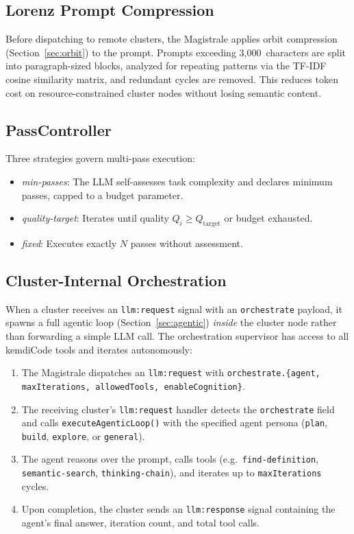 \documentclass[journal,10pt]{IEEEtran}
\newcommand{\code}[1]{\texttt{#1}}
\begin{document}
\subsection{Lorenz Prompt Compression}

Before dispatching to remote clusters, the Magistrale applies orbit compression (Section~\ref{sec:orbit}) to the prompt. Prompts exceeding 3{,}000~characters are split into paragraph-sized blocks, analyzed for repeating patterns via the TF-IDF cosine similarity matrix, and redundant cycles are removed. This reduces token cost on resource-constrained cluster nodes without losing semantic content.

\subsection{PassController}

Three strategies govern multi-pass execution:
\begin{itemize}[nosep]
\item \emph{min-passes}: The LLM self-assesses task complexity and declares minimum passes, capped to a budget parameter.
\item \emph{quality-target}: Iterates until quality $Q_i \geq Q_{\mathrm{target}}$ or budget exhausted.
\item \emph{fixed}: Executes exactly $N$ passes without assessment.
\end{itemize}

\subsection{Cluster-Internal Orchestration}

When a cluster receives an \code{llm:request} signal with an \code{orchestrate} payload, it spawns a full agentic loop (Section~\ref{sec:agentic}) \emph{inside} the cluster node rather than forwarding a simple LLM call. The orchestration supervisor has access to all kemdiCode tools and iterates autonomously:

\begin{enumerate}[nosep]
\item The Magistrale dispatches an \code{llm:request} with \code{orchestrate.\{agent, maxIterations, allowedTools, enableCognition\}}.
\item The receiving cluster's \code{llm:request} handler detects the \code{orchestrate} field and calls \code{executeAgenticLoop()} with the specified agent persona (\code{plan}, \code{build}, \code{explore}, or \code{general}).
\item The agent reasons over the prompt, calls tools (e.g.\ \code{find-definition}, \code{semantic-search}, \code{thinking-chain}), and iterates up to \code{maxIterations} cycles.
\item Upon completion, the cluster sends an \code{llm:response} signal containing the agent's final answer, iteration count, and total tool calls.
\end{enumerate}
\end{document}
